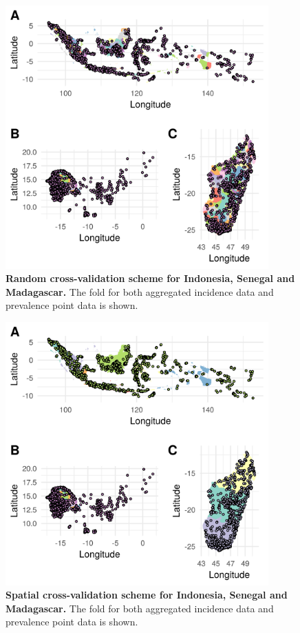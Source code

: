 \documentclass[10pt,a4]{article}
\begin{document}
\begin{figure}[h!]

\centering

\includegraphics[width = 0.9\textwidth]{figures/random_crossvalidation_full.png} 

\caption{{\bf Random cross-validation scheme for Indonesia, Senegal and Madagascar.} The fold for both aggregated incidence data and prevalence point data is shown.}
\label{fig:cv_random}
\end{figure}


\begin{figure}[h!]
\centering

\includegraphics[width = 0.9\textwidth]{figures/spatial_crossvalidation_full.png}

\caption{{\bf Spatial cross-validation scheme for Indonesia, Senegal and Madagascar.} The fold for both aggregated incidence data and prevalence point data is shown.}
\label{fig:cv_spatial}
\end{figure}
\end{document}
